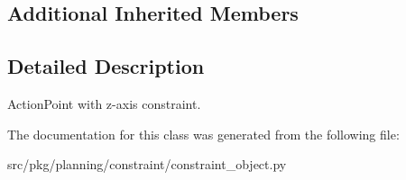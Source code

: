 \subsection*{Additional Inherited Members}


\subsection{Detailed Description}
Action\+Point with z-\/axis constraint. 

The documentation for this class was generated from the following file\+:\begin{DoxyCompactItemize}
\item 
src/pkg/planning/constraint/constraint\+\_\+object.\+py\end{DoxyCompactItemize}
